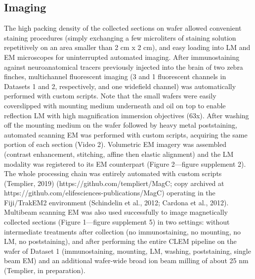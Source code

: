 \documentclass{article}
\begin{document}
\subsection*{Imaging}

The high packing density of the collected sections on wafer allowed convenient staining procedures (simply exchanging a few microliters of staining solution repetitively on an area smaller than 2 cm x 2 cm), and easy loading into LM and EM microscopes for uninterrupted automated imaging. After immunostaining against neuroanatomical tracers previously injected into the brain of two zebra finches, multichannel fluorescent imaging (3 and 1 fluorescent channels in Datasets 1 and 2, respectively, and one widefield channel) was automatically performed with custom scripts. Note that the small wafers were easily coverslipped with mounting medium underneath and oil on top to enable reflection LM with high magnification immersion objectives (63x). After washing off the mounting medium on the wafer followed by heavy metal poststaining, automated scanning EM was performed with custom scripts, acquiring the same portion of each section (Video 2). Volumetric EM imagery was assembled (contrast enhancement, stitching, affine then elastic alignment) and the LM modality was registered to its EM counterpart (Figure 2---figure supplement 2). The whole processing chain was entirely automated with custom scripts (Templier, 2019) (https://github.com/templiert/MagC; copy archived at https://github.com/elifesciences-publications/MagC) operating in the Fiji/TrakEM2 environment (Schindelin et al., 2012; Cardona et al., 2012). Multibeam scanning EM was also used successfully to image magnetically collected sections (Figure 1---figure supplement 5) in two settings: without intermediate treatments after collection (no immunostaining, no mounting, no LM, no poststaining), and after performing the entire CLEM pipeline on the wafer of Dataset 1 (immunostaining, mounting, LM, washing, poststaining, single beam EM) and an additional wafer-wide broad ion beam milling of about 25 nm (Templier, in preparation).
\end{document}
